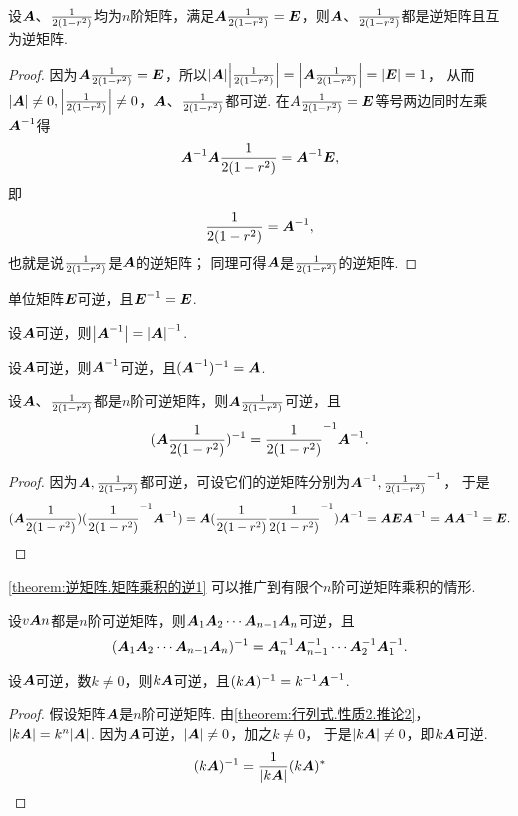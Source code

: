 \begin{property}\label{theorem:逆矩阵.逆矩阵的对称性}
设\(\A\)、\(\B\)均为\(n\)阶矩阵，满足\(\A\B=\E\)，则\(\A\)、\(\B\)都是逆矩阵且互为逆矩阵.
\begin{proof}
因为\(\A\B=\E\)，所以\(\abs{\A}\abs{\B}=\abs{\A\B}=\abs{\E}=1\)，
从而\(\abs{\A}\neq0,\abs{\B}\neq0\)，\(\A\)、\(\B\)都可逆.
在\(A\B=\E\)等号两边同时左乘\(\A^{-1}\)得\[
	\A^{-1}\A\B=\A^{-1}\E,
\]即\[
	\B=\A^{-1},
\]
也就是说\(\B\)是\(\A\)的逆矩阵；
同理可得\(\A\)是\(\B\)的逆矩阵.
\end{proof}
\end{property}

\begin{property}\label{theorem:逆矩阵.单位矩阵可逆}
单位矩阵\(\E\)可逆，且\(\E^{-1}=\E\).
\end{property}

\begin{property}\label{theorem:逆矩阵.逆矩阵的行列式}
设\(\A\)可逆，则\(\abs{\A^{-1}}=\abs{\A}^{-1}\).
\end{property}

\begin{property}\label{theorem:逆矩阵.逆矩阵的逆}
设\(\A\)可逆，则\(\A^{-1}\)可逆，且\((\A^{-1})^{-1}=\A\).
\end{property}

\begin{property}\label{theorem:逆矩阵.矩阵乘积的逆1}
设\(\A\)、\(\B\)都是\(n\)阶可逆矩阵，则\(\A\B\)可逆，且\begin{equation}
(\A \B)^{-1} = \B^{-1} \A^{-1}.
\end{equation}
\begin{proof}
因为\(\A,\B\)都可逆，可设它们的逆矩阵分别为\(\A^{-1},\B^{-1}\)，
于是\[
	(\A\B)(\B^{-1}\A^{-1})
	= \A(\B\B^{-1})\A^{-1}
	= \A\E\A^{-1}
	= \A\A^{-1}
	= \E.
	\qedhere
\]
\end{proof}
\end{property}

\cref{theorem:逆矩阵.矩阵乘积的逆1} 可以推广到有限个\(n\)阶可逆矩阵乘积的情形.
\begin{property}\label{theorem:逆矩阵.矩阵乘积的逆2}
设\(\v{\A}{n}\)都是\(n\)阶可逆矩阵，则\(\A_1 \A_2 \dotsm \A_{n-1} \A_n\)可逆，且\begin{equation}
(\A_1 \A_2 \dotsm \A_{n-1} \A_n)^{-1}
= \A_n^{-1} \A_{n-1}^{-1} \dotsm \A_2^{-1} \A_1^{-1}.
\end{equation}
\end{property}

\begin{property}\label{theorem:逆矩阵.数与矩阵乘积的逆}
设\(\A\)可逆，数\(k\neq0\)，则\(k\A\)可逆，且\((k\A)^{-1}=k^{-1}\A^{-1}\).
\begin{proof}
假设矩阵\(\A\)是\(n\)阶可逆矩阵.
由\cref{theorem:行列式.性质2.推论2}，
\(\abs{k\A} = k^n\abs{\A}\).
因为\(\A\)可逆，\(\abs{\A}\neq0\)，加之\(k\neq0\)，
于是\(\abs{k\A}\neq0\)，即\(k\A\)可逆.\[
(k\A)^{-1} = \frac{1}{\abs{k\A}} (k\A)^*
\]
\end{proof}
\end{property}

